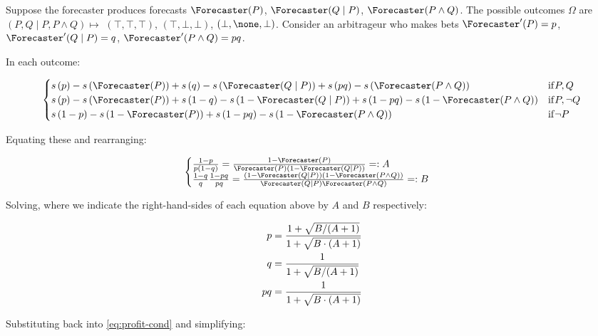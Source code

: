 Suppose the forecaster produces forecasts $\priceP$, $\priceQgivenP$, $\pricePandQ$. The possible outcomes $\Omega$ are $(P,Q\mid P,P\land Q)\mapsto$ $(\top,\top,\top)$, $(\top,\bot,\bot)$, $(\bot,\none,\bot)$. Consider an arbitrageur who makes bets $\Forecaster'(P)=\consp$, $\Forecaster'(Q\mid P)=\consq$, $\Forecaster'(P\land Q)=\consp\consq$.

In each outcome:

\begin{equation}
\begin{cases}
\score{\consp}-\score{\priceP}+\score{\consq}-\score{\priceQgivenP}+\score{\consp\consq}-\score{\pricePandQ}
& \mathrm{if } P,Q\\
\score{\consp}-\score{\priceP}+\score{1-\consq}-\score{1-\priceQgivenP}+\score{1-\consp\consq}-\score{1-\pricePandQ}
& \mathrm{if } P,\lnot Q\\
\score{1-\consp}-\score{1-\priceP}+\score{1-\consp\consq}-\score{1-\pricePandQ}
& \mathrm{if } \lnot P
\end{cases}
\label{eq:profit-cond}
\end{equation}

Equating these and rearranging:

\begin{equation*}
    \begin{cases}
    \frac{1-\consp}{\consp (1-\consq)} = \frac{1-\priceP}{\priceP(1-\priceQgivenP)} =: A\\
    \frac{1-\consq}{\consq}\frac{1-\consp\consq}{\consp\consq} = \frac{(1-\priceQgivenP)(1-\pricePandQ)}{\priceQgivenP\pricePandQ} =: B
    \end{cases}
\end{equation*}

Solving, where we indicate the right-hand-sides of each equation above by $A$ and $B$ respectively:

\begin{align*}
    p &= \frac{1 + \sqrt{B/(A+1)}}{1+\sqrt{B\cdot(A+1)}}\\
    q &= \frac{1}{1+\sqrt{B/(A+1)}}\\
    pq &= \frac{1}{1+\sqrt{B\cdot(A+1)}}
\end{align*}

Substituting back into \ref{eq:profit-cond} and simplifying:

